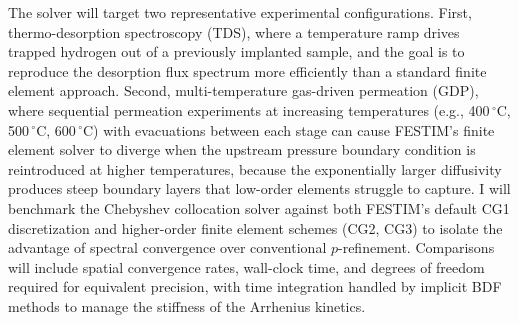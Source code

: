 The solver will target two representative experimental configurations. First, thermo-desorption spectroscopy (TDS), where a temperature ramp drives trapped hydrogen out of a previously implanted sample, and the goal is to reproduce the desorption flux spectrum more efficiently than a standard finite element approach. Second, multi-temperature gas-driven permeation (GDP), where sequential permeation experiments at increasing temperatures (e.g., 400\,$^\circ$C, 500\,$^\circ$C, 600\,$^\circ$C) with evacuations between each stage can cause FESTIM's finite element solver to diverge when the upstream pressure boundary condition is reintroduced at higher temperatures, because the exponentially larger diffusivity produces steep boundary layers that low-order elements struggle to capture. I will benchmark the Chebyshev collocation solver against both FESTIM's default CG1 discretization and higher-order finite element schemes (CG2, CG3) to isolate the advantage of spectral convergence over conventional $p$-refinement. Comparisons will include spatial convergence rates, wall-clock time, and degrees of freedom required for equivalent precision, with time integration handled by implicit BDF methods to manage the stiffness of the Arrhenius kinetics.
